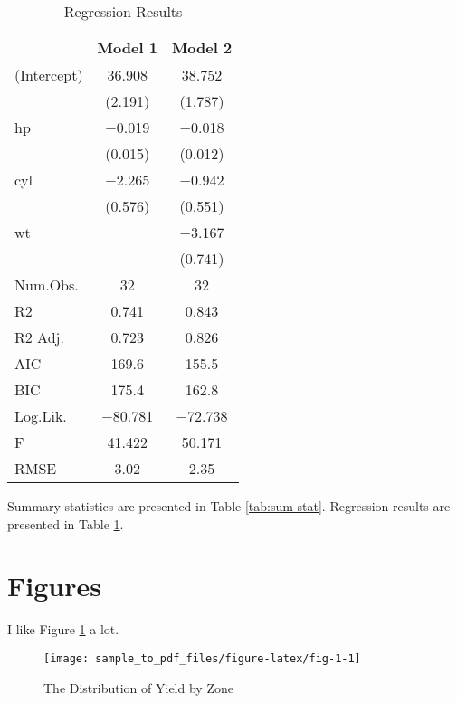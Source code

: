 \documentclass[
  12pt,
]{article}
\begin{document}
\begin{table}[H]

\caption{\label{tab:regtable}Regression Results}
\centering
\begin{tabular}[t]{lcc}
\toprule
  & Model 1 & Model 2\\
\midrule
(Intercept) & \num{36.908} & \num{38.752}\\
 & (\num{2.191}) & (\num{1.787})\\
hp & \num{-0.019} & \num{-0.018}\\
 & (\num{0.015}) & (\num{0.012})\\
cyl & \num{-2.265} & \num{-0.942}\\
 & (\num{0.576}) & (\num{0.551})\\
wt &  & \num{-3.167}\\
 &  & (\num{0.741})\\
\midrule
Num.Obs. & \num{32} & \num{32}\\
R2 & \num{0.741} & \num{0.843}\\
R2 Adj. & \num{0.723} & \num{0.826}\\
AIC & \num{169.6} & \num{155.5}\\
BIC & \num{175.4} & \num{162.8}\\
Log.Lik. & \num{-80.781} & \num{-72.738}\\
F & \num{41.422} & \num{50.171}\\
RMSE & \num{3.02} & \num{2.35}\\
\bottomrule
\end{tabular}
\end{table}

Summary statistics are presented in Table \ref{tab:sum-stat}. Regression results are presented in Table \ref{tab:regtable}.

\newpage

\hypertarget{figures}{%
\section{Figures}\label{figures}}

I like Figure \ref{fig:fig-1} a lot.

\begin{figure}

{\centering \texttt{[image: sample\_to\_pdf\_files/figure-latex/fig-1-1]} 

}

\caption{The Distribution of Yield by Zone}\label{fig:fig-1}
\end{figure}
\end{document}
